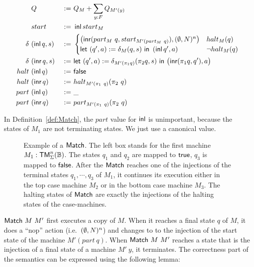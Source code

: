 \begin{definition}[$\MS{Match}~M~M'$]
  \label{def:Match}
  \begin{alignat*}{3}
    & Q                  &~:=~& Q_M +  \sum_{y:F} Q_{M'(y)} \\
    & start              &~:=~& \operatorname{\textsf{inl}} start_M \\
    \delta ~&(\operatorname{\textsf{inl}} q, s) &~:=~&
    \begin{cases}
      \bigl(\operatorname{\textsf{inr}} (part_M~q, start_{M' (part_M~q)}), (\emptyset, N)^n \bigr) & halt_M(q) \\
      \textsf{let}~(q', a) := \delta_M(q, s)~\textsf{in}~\left(\operatorname{\textsf{inl}} q', a \right) & \lnot halt_M(q)
    \end{cases} \\
    \delta ~&(\operatorname{\textsf{inr}} q, s) &~:=~& \textsf{let}~(q', a) := \delta_{M'(\pi_1 q)} (\pi_2 q, s)~\textsf{in}~\bigl( \operatorname{\textsf{inr}} (\pi_1 q, q'), a \bigr) \\
    halt   ~&(\operatorname{\textsf{inl}}  q)   &~:=~& \textsf{false} \\
    halt   ~&(\operatorname{\textsf{inr}}  q)   &~:=~& halt_{M'(\pi_1~q)} (\pi_2~q) \\
    part   ~&(\operatorname{\textsf{inl}}  q)   &~:=~& \_ \\
    part   ~&(\operatorname{\textsf{inr}}  q)   &~:=~& part_{M'(\pi_1~q)} (\pi_2~q)
  \end{alignat*}
\end{definition}

In Definition~\ref{def:Match}, the $part$ value for $\operatorname{\textsf{inl}}$ is unimportant, because the states of $M_1$ are not terminating states.  We just use a
canonical value.

\begin{figure}
  \center
  
  \caption{Example of a $\textsf{Match}$.  The left box stands for the first machine $M_1:\textsf{TM}_\Sigma^n(\mathbb{B})$.  The states $q_1$ and $q_2$ are mapped to
    $\textsf{true}$, $q_3$ is mapped to $\textsf{false}$.  After the $\textsf{Match}$ reaches one of the injections of the terminal states $q_1, \cdots, q_3$ of $M_1$, it
    continues its execution either in the top case machine $M_2$ or in the bottom case machine $M_3$.  The halting states of $\textsf{Match}$ are exactly
    the injections of the halting states of the case-machines.}
  \label{fig:match}
\end{figure}



$\MS{Match}~M~M'$ first executes a copy of $M$.  When it reaches a final state $q$ of $M$, it does a ``nop'' action (i.e.\ $(\emptyset,N)^n$) and changes
to to the injection of the start state of the machine $M'(part~q)$.  When $\MS{Match}~M~M'$ reaches a state that is the injection of a final state of
a machine $M'~y$, it terminates.  The correctness part of the semantics can be expressed using the following lemma:

